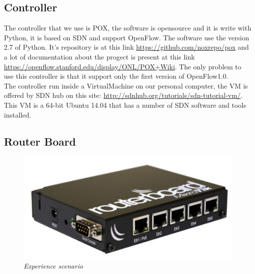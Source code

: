 \documentclass[conference,10pt]{IEEEtran}
\begin{document}
  \subsection{Controller}
  The controller that we use is POX, the software is opensource and it is write with Python, it is based on SDN and support OpenFlow.
  The software use the version 2.7 of Python.
  It's repository is at this link \url{https://github.com/noxrepo/pox} and a lot of documentation about the progect
  is present at this link \url{https://openflow.stanford.edu/display/ONL/POX+Wiki}.
  The only problem to use this controller is that it support only the first version of OpenFlow1.0.
  \\
  The controller run inside a VirtualMachine on our personal computer,
  the VM is offered by SDN hub on this site: \url{http://sdnhub.org/tutorials/sdn-tutorial-vm/}.
  This VM is a 64-bit Ubuntu 14.04 that has a number of SDN software and tools installed.
  \subsection{Router Board}
  \begin{figure}[!h]
 \centering
 \includegraphics[scale=0.30]{images/rboard.png}
 \caption{\emph{Experience scenario}}
 \label{fig:topo}
  \end{figure}
  
\end{document}
